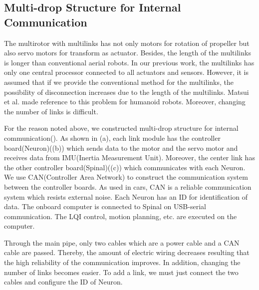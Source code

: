 \subsection{Multi-drop Structure for Internal Communication}
The multirotor with multilinks has not only motors for rotation of propeller but also servo motors for transform as actuator. Besides, the length of the multilinks is longer than conventional aerial robots. In our previous work\cite{Zhao2016}, the multilinks has only one central processor connected to all actuators and sensors. However, it is assumed that if we provide the conventional method for the multilinks, the possibility of disconnection increases due to the length of the multilinks. Matsui et al.\cite{Matsui2005} made reference to this problem for humanoid robots. Moreover, changing the number of links is difficult.
\par
For the reason noted above, we constructed multi-drop structure for internal communication(). As shown in (a), each link module has the controller board(Neuron)((b)) which sends data to the motor and the servo motor and receives data from IMU(Inertia Measurement Unit). Moreover, the center link has the other controller board(Spinal)((c)) which communicates with each Neuron. We use CAN(Controller Area Network)\cite{CAN} to construct the communication system between the controller boards. As used in cars, CAN is a reliable communication system which resists external noise. Each Neuron has an ID for identification of data. The onboard computer is connected to Spinal on USB-serial communication. The LQI control, motion planning, etc. are executed on the computer. 
\par
Through the main pipe, only two cables which are a power cable and a CAN cable are passed. Thereby, the amount of electric wiring decreases resulting that the high reliability of the communication improves. In addition, changing the number of links becomes easier. To add a link, we must just connect the two cables and configure the ID of Neuron. 

